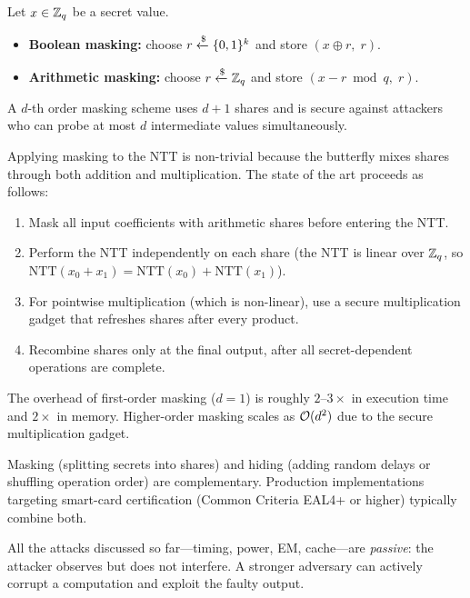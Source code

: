 \begin{definition}
\label{def:masking}
Let $x \in \mathbb{Z}_q$ be a secret value.
\begin{itemize}
\item \textbf{Boolean masking:} choose $r \getsr \{0,1\}^k$ and store $(x \oplus r,\; r)$.
\item \textbf{Arithmetic masking:} choose $r \getsr \Zq$ and store $(x - r \bmod q,\; r)$.
\end{itemize}
A $d$-th order masking scheme uses $d+1$ shares and is secure against attackers who can probe at most $d$ intermediate values simultaneously.
\end{definition}

Applying masking to the NTT is non-trivial because the butterfly mixes shares through both addition and multiplication.  The state of the art proceeds as follows:

\begin{enumerate}
\item Mask all input coefficients with arithmetic shares before entering the NTT.
\item Perform the NTT independently on each share (the NTT is linear over $\mathbb{Z}_q$, so $\mathrm{NTT}(x_0 + x_1) = \mathrm{NTT}(x_0) + \mathrm{NTT}(x_1)$).
\item For pointwise multiplication (which is non-linear), use a secure multiplication gadget that refreshes shares after every product.
\item Recombine shares only at the final output, after all secret-dependent operations are complete.
\end{enumerate}

The overhead of first-order masking ($d=1$) is roughly $2$--$3\times$ in execution time and $2\times$ in memory.  Higher-order masking scales as $\mathcal{O}(d^2)$ due to the secure multiplication gadget.

\begin{remark}
Masking (splitting secrets into shares) and hiding (adding random delays or shuffling operation order) are complementary.  Production implementations targeting smart-card certification (Common Criteria EAL4+ or higher) typically combine both.
\end{remark}

All the attacks discussed so far---timing, power, EM, cache---are \emph{passive}: the attacker observes but does not interfere.  A stronger adversary can actively corrupt a computation and exploit the faulty output.


